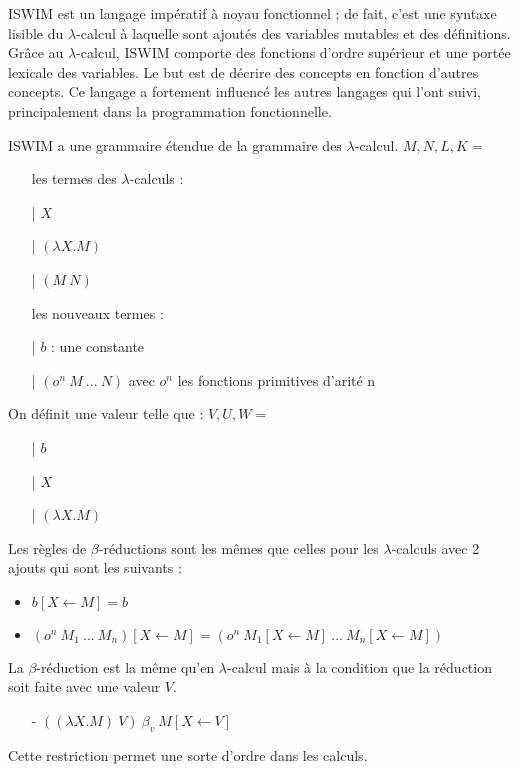 \documentclass[10pt,a4paper]{article}
\begin{document}
				ISWIM est un langage impératif à noyau fonctionnel ; de fait, c'est une syntaxe lisible du $\lambda$-calcul à laquelle sont ajoutés des variables mutables et des définitions. Grâce au $\lambda$-calcul, ISWIM comporte des fonctions d'ordre supérieur et une portée lexicale des variables. Le but est de décrire des concepts en fonction d'autres concepts. Ce langage a fortement influencé les autres langages qui l'ont suivi, principalement dans la programmation fonctionnelle.
				\medbreak
			 
				ISWIM a une grammaire étendue de la grammaire des $\lambda$-calcul.
				\smallbreak
				$M,N,L,K =$
				\begin{itemize}
					\item[ ] les termes des $\lambda$-calculs :
					\item[|] $X$ 
					\item[|] $(\lambda X.M)$
					\item[|] $(M~N)$
					\item[ ] les nouveaux termes :
					\item[|] $b$ : une constante
					\item[|] $(o^{n}~M~...~N)$ avec $o^{n}$ les fonctions primitives d'arité n
				\end{itemize}
				\medbreak
				
				On définit une valeur telle que :
				\smallbreak
				$V,U,W =$
				\begin{itemize}
					\item[|] $b$
					\item[|] $X$
					\item[|] $(\lambda X.M)$
				\end{itemize}
				\bigbreak
				
				
				Les règles de $\beta$-réductions sont les mêmes que celles pour les $\lambda$-calculs avec 2 ajouts qui sont les suivants :
				\begin{itemize}
					\item $b[X \longleftarrow M] = b$
					\item $(o^{n}~M_{1}~...~M_{n})[X \longleftarrow M] = (o^{n}~M_{1}[X \longleftarrow M]~...~M_{n}[X \longleftarrow M])$
				\end{itemize}
				\bigbreak
			
			
				La $\beta$-réduction est la même qu'en $\lambda$-calcul mais à la condition que la réduction soit faite avec une valeur $V$. 
				\begin{itemize}
					\item[-] $((\lambda X.M)~V)~\beta_{v}~M[X \longleftarrow V]$
				\end{itemize} 
				\smallbreak
				Cette restriction permet une sorte d'ordre dans les calculs.
				\medbreak
				
\end{document}
